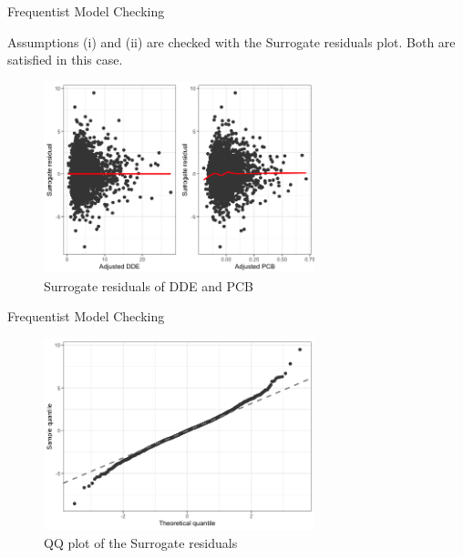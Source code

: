 \documentclass{beamer}\usepackage[]{graphicx}\usepackage[]{color}
\begin{document}
\begin{frame}{Frequentist Model Checking}

Assumptions (i) and (ii) are checked with the Surrogate residuals plot. Both are satisfied in this case.
\begin{figure}
  \centering
  \includegraphics[width=0.7\textwidth]{Surrogate_residuals.png}
\caption{Surrogate residuals of DDE and PCB}
\label{fig:surrogateresid}
\end{figure}
\end{frame}
\begin{frame}{Frequentist Model Checking}

\begin{figure}
  \centering
  \includegraphics[width=0.7\textwidth]{qqplot.png}
\caption{QQ plot of the Surrogate residuals}
\label{fig:qqplot}
\end{figure}
\end{frame}
\end{document}
